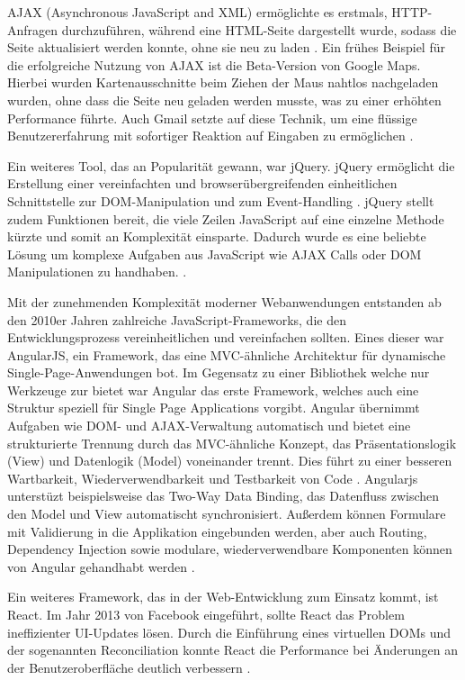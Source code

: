 \documentclass[oneside]{ausarbeitung}
\begin{document}
AJAX (Asynchronous JavaScript and XML) ermöglichte es erstmals, HTTP-Anfragen durchzuführen, während eine HTML-Seite dargestellt wurde, sodass die Seite aktualisiert werden konnte, ohne sie neu zu laden \parencite{ajax-msdn}. Ein frühes Beispiel für die erfolgreiche Nutzung von AJAX ist die Beta-Version von Google Maps. Hierbei wurden Kartenausschnitte beim Ziehen der Maus nahtlos nachgeladen wurden, ohne dass die Seite neu geladen werden musste, was zu einer erhöhten Performance führte. Auch Gmail setzte auf diese Technik, um eine flüssige Benutzererfahrung mit sofortiger Reaktion auf Eingaben zu ermöglichen \parencite{paulson2005ajax}.

Ein weiteres Tool, das an Popularität gewann, war jQuery. jQuery ermöglicht die Erstellung einer vereinfachten und browserübergreifenden einheitlichen Schnittstelle zur DOM-Manipulation und zum Event-Handling \parencite{taft2006jquery}. jQuery stellt zudem Funktionen bereit, die viele Zeilen JavaScript auf eine einzelne Methode kürzte und somit an Komplexität einsparte. Dadurch wurde es eine beliebte Lösung um komplexe Aufgaben aus JavaScript wie AJAX Calls oder DOM Manipulationen zu handhaben. \parencite{w3schoolsJquery}.

Mit der zunehmenden Komplexität moderner Webanwendungen entstanden ab den 2010er Jahren zahlreiche JavaScript-Frameworks, die den Entwicklungsprozess vereinheitlichen und vereinfachen sollten. 
Eines dieser war AngularJS, ein Framework, das eine MVC-ähnliche Architektur für dynamische Single-Page-Anwendungen bot. Im Gegensatz zu einer Bibliothek welche nur Werkzeuge zur  bietet war Angular das erste Framework, welches auch eine Struktur speziell für Single Page Applications vorgibt. Angular übernimmt Aufgaben wie DOM- und AJAX-Verwaltung automatisch und bietet eine strukturierte Trennung durch das MVC-ähnliche Konzept, das Präsentationslogik (View) und Datenlogik (Model) voneinander trennt. Dies führt zu einer besseren Wartbarkeit, Wiederverwendbarkeit und Testbarkeit von Code \parencite{what-is-angularjs}. Angularjs unterstüzt beispielsweise das Two-Way Data Binding, das Datenfluss zwischen den Model und View automatischt synchronisiert. Außerdem können Formulare mit Validierung in die Applikation eingebunden werden, aber auch Routing, Dependency Injection sowie modulare, wiederverwendbare Komponenten können von Angular gehandhabt werden \parencite{angular-history}. 


Ein weiteres Framework, das in der Web-Entwicklung zum Einsatz kommt, ist React. Im Jahr 2013 von Facebook eingeführt, sollte React das Problem ineffizienter UI-Updates lösen. Durch die Einführung eines virtuellen DOMs und der sogenannten Reconciliation konnte React die Performance bei Änderungen an der Benutzeroberfläche deutlich verbessern \parencite{hunt2013react}.
\end{document}
